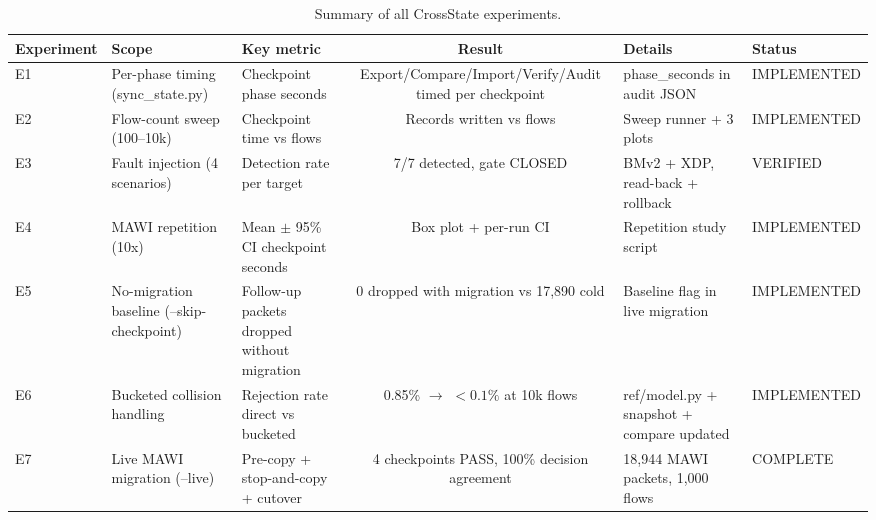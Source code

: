 \begin{table}[!t]
\centering
\footnotesize
\setlength{\tabcolsep}{4pt}
\renewcommand{\arraystretch}{1.15}
\caption{Summary of all CrossState experiments.}
\label{tab:experiments}
\begin{tabular}{@{}lllcp{3.2cm}l@{}}
\toprule
\textbf{Experiment} & \textbf{Scope} & \textbf{Key metric} & \textbf{Result} & \textbf{Details} & \textbf{Status} \\
\midrule
E1 & Per-phase timing (sync\_state.py) & Checkpoint phase seconds & Export/Compare/Import/Verify/Audit timed per checkpoint & phase\_seconds in audit JSON & IMPLEMENTED \\
E2 & Flow-count sweep (100--10k) & Checkpoint time vs flows & Records written vs flows & Sweep runner + 3 plots & IMPLEMENTED \\
E3 & Fault injection (4 scenarios) & Detection rate per target & 7/7 detected, gate CLOSED & BMv2 + XDP, read-back + rollback & VERIFIED \\
E4 & MAWI repetition (10x) & Mean $\pm$ 95\% CI checkpoint seconds & Box plot + per-run CI & Repetition study script & IMPLEMENTED \\
E5 & No-migration baseline (--skip-checkpoint) & Follow-up packets dropped without migration & 0 dropped with migration vs 17,890 cold & Baseline flag in live migration & IMPLEMENTED \\
E6 & Bucketed collision handling & Rejection rate direct vs bucketed & 0.85\% $\to$ $<0.1\%$ at 10k flows & ref/model.py + snapshot + compare updated & IMPLEMENTED \\
E7 & Live MAWI migration (--live) & Pre-copy + stop-and-copy + cutover & 4 checkpoints PASS, 100\% decision agreement & 18,944 MAWI packets, 1,000 flows & COMPLETE \\
\bottomrule
\end{tabular}
\end{table}